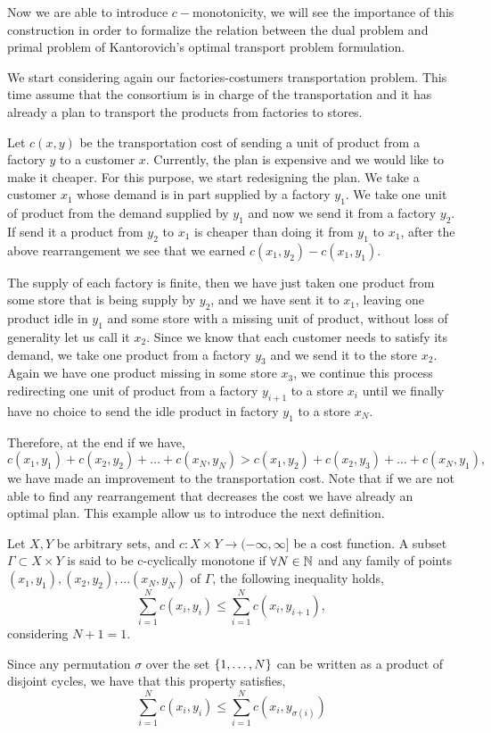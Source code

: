 Now we are able to introduce $c-$monotonicity, we will see the importance of this construction in order to formalize the relation between the dual problem and primal problem of Kantorovich's optimal transport problem formulation. 

We start considering again our factories-costumers transportation problem. This time assume that the consortium is in charge of the transportation and it has already a plan to transport the products from factories to stores. 

Let $c(x,y)$ be the transportation cost of sending a unit of product from a factory $y$ to a customer $x$. Currently, the plan is expensive and we would like to make it cheaper.  For this purpose, we start redesigning the plan. We take a customer $x_1$ whose demand is in part supplied by a factory $y_1$. We take one unit of product from the demand supplied by $y_1$ and now we send it from a factory $y_2$. If send it a product from $y_2$ to $x_1$ is cheaper than doing it from $y_1$ to $x_1$, after the above rearrangement we see that we earned $c(x_1, y_2)-c(x_1,y_1)$. 

The supply of each factory is finite, then we have just taken one product from some store that is being supply by $y_2$, and we have sent it to $x_1$, leaving one product idle in $y_1$ and some store with a missing unit of product, without loss of generality let us call it $x_2$. Since we know that each customer needs to satisfy its demand, we take one product from a factory $y_3$ and we send it to the store $x_2$. Again we have one product missing in some store $x_3$, we continue this process redirecting one unit of product from a factory $y_{i+1}$ to a store $x_{i}$ until we finally have no choice to send the idle product in factory $y_1$ to a store $x_N$. 

Therefore, at the end if we have, 
\begin{equation*}
	c(x_1, y_1)+c(x_2, y_2)+\dots+c(x_N, y_N)> c(x_1, y_2)+c(x_2,y_3)+\dots+c(x_N, y_1), 
\end{equation*}
we have made an improvement to the transportation cost.  Note that if we are not able to find any rearrangement that decreases the cost we have already an optimal plan. This example allow us to introduce the next definition.
\begin{definition}
	Let $X , Y$ be arbitrary sets, and $c:X\times Y \rightarrow (-\infty, \infty]$ be a cost function. A subset $\Gamma \subset X \times Y$ is said to be c-cyclically monotone if $\forall N\in\mathbb{N}$ and any family of points $(x_1, y_1), (x_2, y_2), \dots (x_N, y_N)$ of $\Gamma$, the following inequality holds,
	\begin{equation*}
	\sum_{i=1}^{N} c(x_i, y_i) \leq \sum_{i=1}^{N} c(x_i, y_{i+1}),
	\end{equation*} 
	considering $N+1=1$. 
\end{definition}
Since any permutation $\sigma$ over the set $\left\lbrace 1, \dots, N \right\rbrace$ can be written as a product of disjoint cycles, we have that this property satisfies,
\begin{equation}
\sum_{i=1}^{N} c(x_i, y_i) \leq \sum_{i=1}^{N} c(x_i, y_{\sigma(i)}) 
\end{equation}


